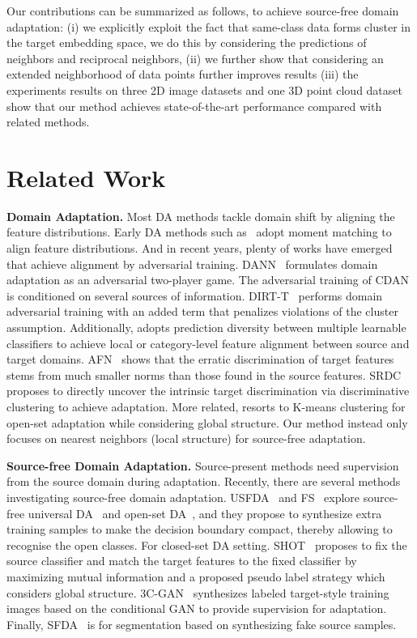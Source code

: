 \documentclass{article}
\begin{document}
Our contributions can be summarized as follows, to achieve source-free domain adaptation: (i) we explicitly exploit the fact that same-class data forms cluster in the target embedding space, we do this by considering the predictions of neighbors and reciprocal neighbors, (ii) we further show that considering an extended neighborhood of data points further improves results (iii) the experiments results on three 2D image datasets and one 3D point cloud dataset show that our method achieves state-of-the-art performance compared with related methods.

\section{Related Work}
\noindent \textbf{Domain Adaptation.}
Most DA methods tackle domain shift by aligning the feature distributions. Early DA methods such as~\cite{long2015learning,sun2016return,tzeng2014deep} adopt moment matching to align feature distributions. And in recent years, plenty of works have emerged that achieve alignment by adversarial training. DANN~\cite{ganin2016domain} formulates domain adaptation as an adversarial two-player game. The  adversarial training of CDAN~\cite{long2018conditional} is conditioned on several sources of information. DIRT-T~\cite{shu2018dirt} performs domain adversarial training with an added term that penalizes violations of the cluster assumption. Additionally, \cite{Lee_2019_CVPR,lu2020stochastic,saito2018maximum} adopts prediction diversity between multiple learnable classifiers to achieve local or category-level feature alignment between source and target domains. AFN~\cite{Xu_2019_ICCV} shows that the erratic discrimination of target features stems from much smaller norms than those found in the source features. SRDC~\cite{tang2020unsupervised} proposes to directly uncover the intrinsic target discrimination via discriminative clustering to achieve adaptation. {More related, \cite{pan2020exploring} resorts to K-means clustering for open-set adaptation while considering global structure. Our method instead only focuses on nearest neighbors (local structure) for source-free adaptation}. 

\noindent \textbf{Source-free Domain Adaptation.}
Source-present methods need supervision from the source domain during adaptation. Recently, there are several methods investigating source-free domain adaptation. USFDA~\cite{kundu2020universal} and FS~\cite{kundu2020towards} explore source-free universal DA~\cite{you2019universal} and open-set DA~\cite{saito2018open}, and they propose to synthesize extra training samples to make the decision boundary compact, thereby allowing to recognise the open classes. For closed-set DA setting. SHOT~\cite{liang2020we} proposes to fix the source classifier and match the target features to the fixed classifier by maximizing mutual information and a proposed pseudo label strategy {which considers global structure}. 3C-GAN~\cite{li2020model} synthesizes labeled target-style training images based on the conditional GAN to provide supervision for adaptation. {Finally, SFDA~\cite{liu2021source} is for segmentation based on synthesizing fake source samples. }
\end{document}
